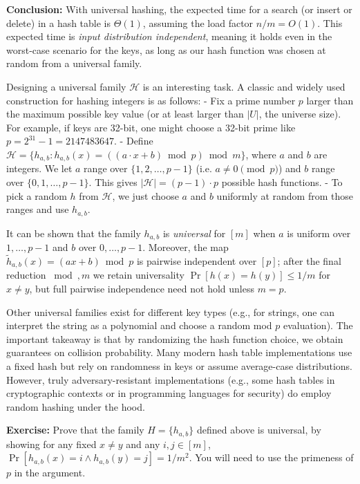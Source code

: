 \documentclass[11pt]{article}
\begin{document}
\textbf{Conclusion:} With universal hashing, the expected time for a search (or insert or delete) in a hash table is $\Theta(1)$, assuming the load factor $n/m = O(1)$. This expected time is \emph{input distribution independent}, meaning it holds even in the worst-case scenario for the keys, as long as our hash function was chosen at random from a universal family.

Designing a universal family $\mathcal{H}$ is an interesting task. A classic and widely used construction for hashing integers is as follows:
- Fix a prime number $p$ larger than the maximum possible key value (or at least larger than $|U|$, the universe size). For example, if keys are 32-bit, one might choose a 32-bit prime like $p = 2^{31}-1 = 2147483647$.
- Define $\mathcal{H} = \{ h_{a,b} : h_{a,b}(x) = ((a \cdot x + b) \bmod p) \bmod m \}$, where $a$ and $b$ are integers. We let $a$ range over $\{1,2,\ldots, p-1\}$ (i.e. $a \neq 0 \pmod p$) and $b$ range over $\{0,1,\ldots,p-1\}$. This gives $|\mathcal{H}| = (p-1)\cdot p$ possible hash functions.
- To pick a random $h$ from $\mathcal{H}$, we just choose $a$ and $b$ uniformly at random from those ranges and use $h_{a,b}$.

It can be shown that the family ${h_{a,b}}$ is \emph{universal} for $[m]$ when $a$ is uniform over ${1,\dots,p-1}$ and $b$ over ${0,\dots,p-1}$. Moreover, the map $\tilde h_{a,b}(x)=(ax+b)\bmod p$ is pairwise independent over $[p]$; after the final reduction $\bmod, m$ we retain universality $\Pr[h(x)=h(y)]\le 1/m$ for $x\ne y$, but full pairwise independence need not hold unless $m=p$.

Other universal families exist for different key types (e.g., for strings, one can interpret the string as a polynomial and choose a random mod $p$ evaluation). The important takeaway is that by randomizing the hash function choice, we obtain guarantees on collision probability. Many modern hash table implementations use a fixed hash but rely on randomness in keys or assume average-case distributions. However, truly adversary-resistant implementations (e.g., some hash tables in cryptographic contexts or in programming languages for security) do employ random hashing under the hood.

\textbf{Exercise:} Prove that the family $H = \{h_{a,b}\}$ defined above is universal, by showing for any fixed $x \neq y$ and any $i,j \in [m]$, $\Pr[h_{a,b}(x)=i \wedge h_{a,b}(y)=j] = 1/m^2$. You will need to use the primeness of $p$ in the argument.
\end{document}
